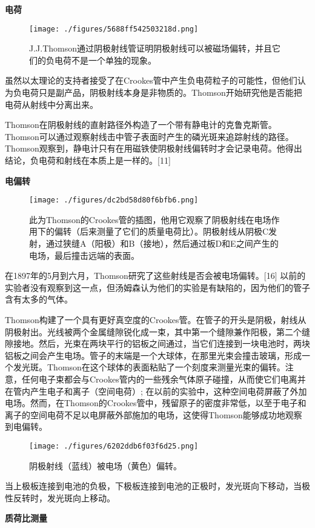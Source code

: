 \textbf{电荷}

\begin{figure}[ht]
\centering
\texttt{[image: ./figures/5688ff542503218d.png]}
\caption{J.J.Thomson通过阴极射线管证明阴极射线可以被磁场偏转，并且它们的负电荷不是一个单独的现象。} \label{fig_Joseph_2}
\end{figure}
虽然以太理论的支持者接受了在Crookes管中产生负电荷粒子的可能性，但他们认为负电荷只是副产品，阴极射线本身是非物质的。Thomson开始研究他是否能把电荷从射线中分离出来。

Thomson在阴极射线的直射路径外构造了一个带有静电计的克鲁克斯管。Thomson可以通过观察射线击中管子表面时产生的磷光斑来追踪射线的路径。Thomson观察到，静电计只有在用磁铁使阴极射线偏转时才会记录电荷。他得出结论，负电荷和射线在本质上是一样的。[11]

\textbf{电偏转}

\begin{figure}[ht]
\centering
\texttt{[image: ./figures/dc2bd58d80f6bfb6.png]}
\caption{此为Thomson的Crookes管的插图，他用它观察了阴极射线在电场作用下的偏转（后来测量了它们的质量电荷比）。阴极射线从阴极C发射，通过狭缝A（阳极）和B（接地），然后通过板D和E之间产生的电场，最后撞击远端的表面。} \label{fig_Joseph_3}
\end{figure}
在1897年的5月到六月，Thomson研究了这些射线是否会被电场偏转。[16] 以前的实验者没有观察到这一点，但汤姆森认为他们的实验是有缺陷的，因为他们的管子含有太多的气体。

Thomson构建了一个具有更好真空度的Crookes管。在管子的开头是阴极，射线从阴极射出。光线被两个金属缝隙锐化成一束，其中第一个缝隙兼作阳极，第二个缝隙接地。然后，光束在两块平行的铝板之间通过，当它们连接到一块电池时，两块铝板之间会产生电场。管子的末端是一个大球体，在那里光束会撞击玻璃，形成一个发光斑。Thomson在这个球体的表面粘贴了一个刻度来测量光束的偏转。注意，任何电子束都会与Crookes管内的一些残余气体原子碰撞，从而使它们电离并在管内产生电子和离子（空间电荷）; 在以前的实验中，这种空间电荷屏蔽了外加电场。然而，在Thomson的Crookes管中，残留原子的密度非常低，以至于电子和离子的空间电荷不足以电屏蔽外部施加的电场，这使得Thomson能够成功地观察到电偏转。
\begin{figure}[ht]
\centering
\texttt{[image: ./figures/6202ddb6f03f6d25.png]}
\caption{阴极射线（蓝线）被电场（黄色）偏转。} \label{fig_Joseph_4}
\end{figure}
当上极板连接到电池的负极，下极板连接到电池的正极时，发光斑向下移动，当极性反转时，发光斑向上移动。

\textbf{质荷比测量}

